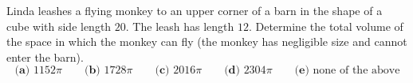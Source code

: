 Linda leashes a flying monkey to an upper corner of a barn in the shape of a cube with side length $20$. The leash has length $12$. Determine the total volume of the space in which the monkey can fly (the monkey has negligible size and cannot enter the barn).
\[
\textbf{(a) }1152\pi\qquad\textbf{(b) }1728\pi\qquad\textbf{(c) }2016\pi\qquad\textbf{(d) }2304\pi\qquad\textbf{(e) }\text{none of the above}
\]
